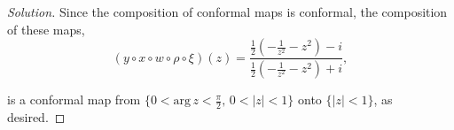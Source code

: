 \documentclass[11pt]{article}
\newenvironment{solution}
  {\renewcommand\qedsymbol{$\blacksquare$}\begin{proof}[Solution]}
  {\end{proof}}
\theoremstyle{definition}
\begin{document}
\begin{solution}
Since the composition of conformal maps is conformal, the composition of these maps, \[(y \circ x \circ w \circ \rho \circ \xi)(z) = \boxed{\frac{\frac{1}{2}\left( -\frac{1}{z^2} - z^2 \right) - i}{{\frac{1}{2}\left( -\frac{1}{z^2} - z^2 \right) + i}}},\]

is a conformal map from $\{0 < \mathrm{arg} \, z < \frac{\pi}{2}, \, 0 < |z| < 1 \}$ onto $\{|z| < 1\}$, as desired.\end{solution}
\end{document}
